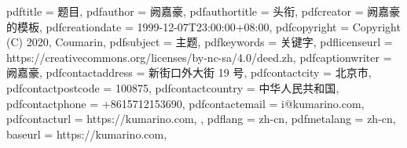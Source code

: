 
\hypersetup
{
	pdftitle			= {题目},
	pdfauthor			= {阙嘉豪},
	pdfauthortitle		= {头衔},
	pdfcreator			= {阙嘉豪的模板},
	pdfcreationdate		= {1999-12-07T23:00:00+08:00},
	pdfcopyright		= {Copyright (C) 2020, Coumarin},
	pdfsubject			= {主题},
	pdfkeywords			= {关键字},
	pdflicenseurl		= {https://creativecommons.org/licenses/by-nc-sa/4.0/deed.zh},
	pdfcaptionwriter	= {阙嘉豪},
	pdfcontactaddress	= {新街口外大街 19 号},
	pdfcontactcity		= {北京市},
	pdfcontactpostcode	= {100875},
	pdfcontactcountry	= {中华人民共和国},
	pdfcontactphone		= {+8615712153690},
	pdfcontactemail		= {i@kumarino.com},
	pdfcontacturl		= {%
		https://kumarino.com,
	},
	pdflang				= {zh-cn},
	pdfmetalang			= {zh-cn},
	baseurl				= {https://kumarino.com},
}
